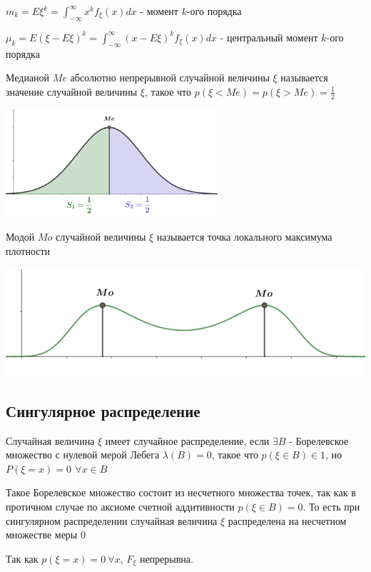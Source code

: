 \documentclass[12pt]{article}
\begin{document}
    $m_k = E\xi^k = \int_{-\infty}^\infty x^k f_\xi(x)dx$ - момент $k$-ого порядка

    $\mu_k = E(\xi - E\xi)^k = \int_{-\infty}^\infty (x - E\xi)^k f_\xi(x)dx$ - центральный момент $k$-ого порядка

    \Def Медианой $Me$ абсолютно непрерывной случайной величины $\xi$ называется значение случайной величины $\xi$, такое что $p(\xi < Me) = p(\xi > Me) = \frac{1}{2}$
    
    \includegraphics[height=4cm]{probtheory/images/probtheory_2024_10_22_5}

    \Def Модой $Mo$ случайной величины $\xi$ называется точка локального максимума плотности

    \includegraphics[height=4cm]{probtheory/images/probtheory_2024_10_22_6}

    \subsection{Сингулярное распределение}

    \Def Случайная величина $\xi$ имеет случайное распределение, если $\exists B$ - Борелевское множество с нулевой мерой Лебега $\lambda(B) = 0$, такое что $p(\xi \in B) \in 1$, но $P(\xi = x) = 0 \ \, \forall x \in B$

    \Nota Такое Борелевское множество состоит из несчетного множества точек, так как в протичном случае по аксиоме счетной аддитивности $p(\xi \in B) = 0$. То есть 
    при сингулярном распределении случайная величина $\xi$ распределена на несчетном множестве меры 0

    \Notas Так как $p(\xi = x) = 0 \  \forall x$, $F_\xi$ непрерывна.
\end{document}

